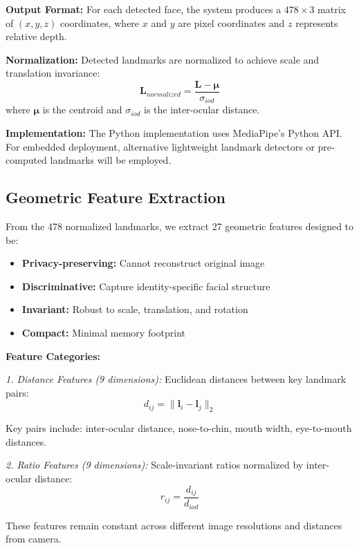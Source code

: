 \documentclass[a4paper,12pt]{article}
\begin{document}
\textbf{Output Format:} For each detected face, the system produces a $478 \times 3$ matrix of $(x, y, z)$ coordinates, where $x$ and $y$ are pixel coordinates and $z$ represents relative depth.

\textbf{Normalization:} Detected landmarks are normalized to achieve scale and translation invariance:
\begin{equation}
\mathbf{L}_{normalized} = \frac{\mathbf{L} - \mathbf{\mu}}{\sigma_{iod}}
\end{equation}
where $\mathbf{\mu}$ is the centroid and $\sigma_{iod}$ is the inter-ocular distance.

\textbf{Implementation:} The Python implementation uses MediaPipe's Python API. For embedded deployment, alternative lightweight landmark detectors or pre-computed landmarks will be employed.

\subsection{Geometric Feature Extraction}

From the 478 normalized landmarks, we extract 27 geometric features designed to be:
\begin{itemize}
    \item \textbf{Privacy-preserving:} Cannot reconstruct original image
    \item \textbf{Discriminative:} Capture identity-specific facial structure
    \item \textbf{Invariant:} Robust to scale, translation, and rotation
    \item \textbf{Compact:} Minimal memory footprint
\end{itemize}

\textbf{Feature Categories:}

\textit{1. Distance Features (9 dimensions):}
Euclidean distances between key landmark pairs:
\begin{equation}
d_{ij} = \|\mathbf{l}_i - \mathbf{l}_j\|_2
\end{equation}

Key pairs include: inter-ocular distance, nose-to-chin, mouth width, eye-to-mouth distances.

\textit{2. Ratio Features (9 dimensions):}
Scale-invariant ratios normalized by inter-ocular distance:
\begin{equation}
r_{ij} = \frac{d_{ij}}{d_{iod}}
\end{equation}

These features remain constant across different image resolutions and distances from camera.
\end{document}
